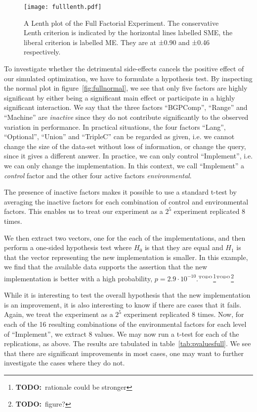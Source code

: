 \documentclass{article}
\newcommand{\todo}[1]{\ensuremath{^{\textrm{\tiny{TODO}\normalsize}}}\footnote{\textbf{TODO:}~#1}}
\begin{document}
\begin{figure}[h]
  \texttt{[image: fulllenth.pdf]}
  \caption{A Lenth plot of the Full Factorial Experiment. The
    conservative Lenth criterion is indicated by the horizontal lines
    labelled SME, the liberal criterion is labelled ME. They are at
    ±0.90 and ±0.46 respectively. }\label{fig:fulllenth}
\end{figure}

To investigate whether the detrimental side-effects cancels the
positive effect of our simulated optimization, we have to formulate a
hypothesis test. By inspecting the normal plot in
figure~\ref{fig:fullnormal}, we see that only five factors are highly
significant by either being a significant main effect or participate
in a highly significant interaction. We say that the three factors
``BGPComp'', ``Range'' and ``Machine'' are \emph{inactive} since they
do not contribute significantly to the observed variation in
performance. In practical situations, the four factors ``Lang'',
``Optional'', ``Union'' and ``TripleC'' can be regarded as given,
i.e. we cannot change the size of the data-set without loss of
information, or change the query, since it gives a different
answer. In practice, we can only control ``Implement'', i.e. we can
only change the implementation. In this context, we call ``Implement''
a \emph{control} factor and the other four active factors
\emph{environmental}.

The presence of inactive factors makes it possible to use a standard
t-test by averaging the inactive factors for each combination of
control and environmental factors. This enables us to treat our
experiment as a $2^5$ experiment replicated 8 times.

We then extract two vectors, one for the each of the implementations,
and then perform a one-sided hypothesis test where $H_0$ is that they
are equal and $H_1$ is that the vector representing the new
implementation is smaller. In this example, we find that the available
data supports the assertion that the new implementation is better with a
high probability, $p=2.9 \cdot 10^{-10}$.\todo{rationale could be
  stronger}\todo{figure?}

While it is interesting to test the overall hypothesis that the new
implementation is an improvement, it is also interesting to know if
there are cases that it fails. Again, we treat the experiment as a
$2^5$ experiment replicated 8 times. Now, for each of the 16 resulting
combinations of the environmental factors for each level of
``Implement'', we extract 8 values. We may now run a t-test for each
of the replications, as above. The results are tabulated in
table~\ref{tab:pvaluesfull}. We see that there are significant
improvements in most cases, one may want to further investigate the
cases where they do not.
\end{document}
